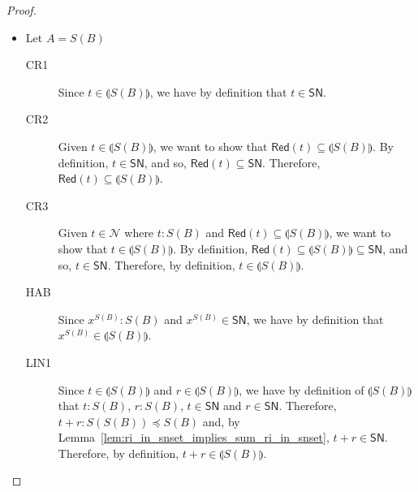 \documentclass[preprint]{elsarticle}
\newcommand\interp[1]{\llparenthesis #1\rrparenthesis}
\newcommand\Red[1]{\mathsf{Red}(#1)}
\newcommand\SN{\mathsf{SN}}
\newcommand\z[1][A]{\vec 0_{S(#1)}}
\newcommand\nullvec[1]{\z[#1]}
\newcommand{\app}[2]{#1 #2}
\begin{document}
\begin{proof}
\begin{itemize}
    \item Let \( A = S(B) \)
    \begin{description}
      \item[CR1]
         Since \( t \in \interp{S(B)} \), we have by definition that \( t \in \SN \).
      \item[CR2]
         Given \( t \in \interp{S(B)} \), we want to show that \( \Red{t} \subseteq \interp{S(B)} \).
        By definition, \( t \in \SN \), and so, \( \Red{t} \subseteq \SN \). Therefore, \( \Red{t} \subseteq \interp{S(B)} \).
      \item[CR3]
         Given \( t \in \mathcal{N} \) where $t:S(B)$ and \( \Red{t} \subseteq \interp{S(B)} \), we want to show that \( t \in \interp{S(B)} \).
        By definition, \( \Red{t}\subseteq\interp{S(B)} \subseteq \SN \), and so, \( t \in \SN \). Therefore, by definition, \( t \in \interp{S(B)} \).
      \item[HAB]
       Since \( x^{S(B)} : S(B) \) and \( x^{S(B)} \in \SN \), we have by definition that \( x^{S(B)} \in \interp{S(B)} \).
      \item[LIN1]
         Since \( t \in \interp{S(B)} \) and \( r \in \interp{S(B)} \), we have by definition of \( \interp{S(B)} \) that \( t : S(B) \), \( r : S(B) \), \( t \in \SN \) and \( r \in \SN \). Therefore, \( t + r : S(S(B)) \preceq S(B) \) and, by Lemma~\ref{lem:ri_in_snset_implies_sum_ri_in_snset}, \( t + r \in \SN \). Therefore, by definition, \( t + r \in \interp{S(B)} \).

\end{description}
\end{itemize}
\end{proof}
\end{document}
